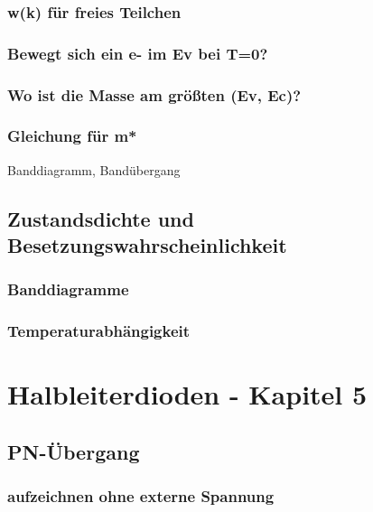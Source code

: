\documentclass{article}
\begin{document}
    \subsubsection{w(k) für freies Teilchen}
    \subsubsection{Bewegt sich ein e- im Ev bei T=0?}
    \subsubsection{Wo ist die Masse am größten (Ev, Ec)?}
    \subsubsection{Gleichung für m*}

Banddiagramm, Band\"ubergang
\subsection{Zustandsdichte und Besetzungswahrscheinlichkeit}\label{k4:zustandsDichte}
    \subsubsection{Banddiagramme}
    \subsubsection{Temperaturabh\"angigkeit}

\section{Halbleiterdioden - Kapitel 5}
\subsection{PN-Übergang}\label{k5:pn}
	\subsubsection{aufzeichnen ohne externe Spannung}
	
\end{document}

